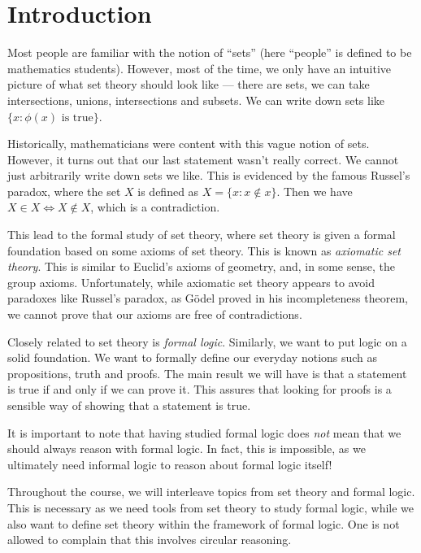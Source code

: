 \documentclass[a4paper]{article}
\begin{document}
\tableofcontents

\setcounter{section}{-1}
\section{Introduction}
Most people are familiar with the notion of ``sets'' (here ``people'' is defined to be mathematics students). However, most of the time, we only have an intuitive picture of what set theory should look like --- there are sets, we can take intersections, unions, intersections and subsets. We can write down sets like $\{x: \phi(x)\text{ is true}\}$.

Historically, mathematicians were content with this vague notion of sets. However, it turns out that our last statement wasn't really correct. We cannot just arbitrarily write down sets we like. This is evidenced by the famous Russel's paradox, where the set $X$ is defined as $X = \{x: x\not \in x\}$. Then we have $X\in X \Leftrightarrow X\not\in X$, which is a contradiction.

This lead to the formal study of set theory, where set theory is given a formal foundation based on some axioms of set theory. This is known as \emph{axiomatic set theory}. This is similar to Euclid's axioms of geometry, and, in some sense, the group axioms. Unfortunately, while axiomatic set theory appears to avoid paradoxes like Russel's paradox, as G\"odel proved in his incompleteness theorem, we cannot prove that our axioms are free of contradictions.

Closely related to set theory is \emph{formal logic}. Similarly, we want to put logic on a solid foundation. We want to formally define our everyday notions such as propositions, truth and proofs. The main result we will have is that a statement is true if and only if we can prove it. This assures that looking for proofs is a sensible way of showing that a statement is true.

It is important to note that having studied formal logic does \emph{not} mean that we should always reason with formal logic. In fact, this is impossible, as we ultimately need informal logic to reason about formal logic itself!

Throughout the course, we will interleave topics from set theory and formal logic. This is necessary as we need tools from set theory to study formal logic, while we also want to define set theory within the framework of formal logic. One is not allowed to complain that this involves circular reasoning.
\end{document}
